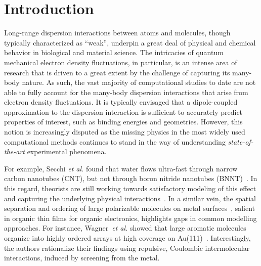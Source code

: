 \documentclass[aps,prl,groupaddress, twocolumn]{revtex4-1}  %
\begin{document}
\section*{Introduction} 
Long-range dispersion interactions between atoms and molecules, though typically characterized as ``weak'', underpin a great deal of physical and chemical behavior in biological and material science. The intricacies of quantum mechanical electron density fluctuations, in particular, is an intense area of research that is driven to a great extent by the challenge of capturing its many-body nature. As such, the vast majority of computational studies to date are not able to fully account for the many-body dispersion interactions that arise from electron density fluctuations. It is typically envisaged that a dipole-coupled approximation to the dispersion interaction is sufficient to accurately predict properties of interest, such as binding energies and geometries. However, this notion is increasingly disputed as the missing physics in the most widely used computational methods continues to stand in the way of understanding \textit{state-of-the-art} experimental phenomena. 

For example, Secchi \textit{et al.} found that water flows ultra-fast through narrow carbon nanotubes (CNT), but not through boron nitride nanotubes (BNNT)~\cite{secchi2016massive}. In this regard, theorists are still working towards satisfactory modeling of this effect and capturing the underlying physical interactions~\cite{Michaelides2016,Kannam2013,Striolo2016,Mattia2015266}. In a similar vein, the spatial separation and ordering of large polarizable molecules on metal surfaces~\cite{Wagner2010,Thussing2016}, salient in organic thin films for organic electronics, highlights gaps in common modelling approaches. For instance, Wagner~\textit{et al.} showed that large aromatic molecules organize into highly ordered arrays at high coverage on Au(111)~\cite{Wagner2010}. Interestingly, the authors rationalize their findings using repulsive, Coulombic intermolecular interactions, induced by screening from the metal.  %

\end{document}
